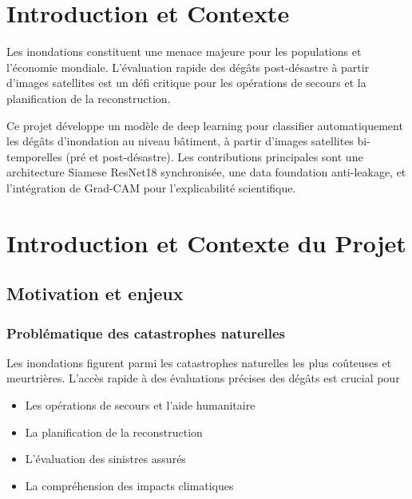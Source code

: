 % 
%


\section{Introduction et Contexte}

Les inondations constituent une menace majeure pour les populations et l'économie mondiale. 
L'évaluation rapide des dégâts post-désastre à partir d'images satellites est un défi critique 
pour les opérations de secours et la planification de la reconstruction.

Ce projet développe un modèle de deep learning pour classifier automatiquement les dégâts 
d'inondation au niveau bâtiment, à partir d'images satellites bi-temporelles (pré et post-désastre). 
Les contributions principales sont\: une architecture Siamese ResNet18 synchronisée, 
une data foundation anti-leakage, et l'intégration de Grad-CAM pour l'explicabilité scientifique.



\section{Introduction et Contexte du Projet}

\subsection{Motivation et enjeux}
\subsubsection{Problématique des catastrophes naturelles}
Les inondations figurent parmi les catastrophes naturelles les plus coûteuses et meurtrières. 
L'accès rapide à des évaluations précises des dégâts est crucial pour\:
\begin{itemize}
    \item Les opérations de secours et l'aide humanitaire
    \item La planification de la reconstruction
    \item L'évaluation des sinistres assurés
    \item La compréhension des impacts climatiques
\end{itemize}

